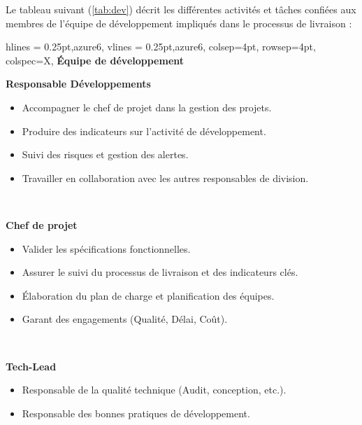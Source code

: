 Le tableau suivant (\ref{tab:dev}) décrit les différentes activités et tâches confiées aux membres de l'équipe de développement impliqués dans le processus de livraison :
\begin{longtblr}[caption={Responsabilités et missions des différents acteurs de l'équipe de dév}, label={tab:dev}]{
    hlines = {0.25pt,azure6},
    vlines = {0.25pt,azure6},
    colsep=4pt,
    rowsep=4pt,
	colspec={X},
}
\textbf{Équipe de développement}
\\
\begin{minipage}{\linewidth}
{ \color{actGreen}
\textbf{Responsable Développements}\\
}
 \begin{itemize}
    \item Accompagner le chef de projet dans la gestion des projets.
    \item Produire des indicateurs sur l’activité de développement.
    \item Suivi des risques et gestion des alertes.
    \item Travailler en collaboration avec les autres responsables de division.\\
 \end{itemize}
\end{minipage}
\\
\begin{minipage}{\linewidth}
    {
        \color{actBlue}\textbf{Chef de projet}\\
    }
    \begin{itemize}
        \item Valider les spécifications fonctionnelles.
        \item Assurer le suivi du processus de livraison et des indicateurs clés.
        \item Élaboration du plan de charge et planification des équipes.
        \item Garant des engagements (Qualité, Délai, Coût).\\
    \end{itemize}
\end{minipage}\\
\begin{minipage}{\linewidth}
    {
        \color{actPink}\textbf{Tech-Lead}\\
    }
    \begin{itemize}
        \item Responsable de la qualité technique (Audit, conception, etc.).
        \item Responsable des bonnes pratiques de développement.

\end{itemize}
\end{minipage}
\end{longtblr}
